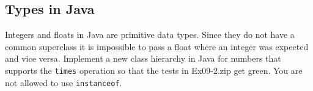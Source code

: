\documentclass [11pt, a4wide, twoside]{article}
\begin{document}
%
%
%

\subsection{Types in Java}
Integers and floats in Java are primitive data types. Since they do not have a
common superclass it is impossible to pass a float where an integer was
expected and vice versa. Implement a new class hierarchy in Java for numbers
that supports the \verb$times$ operation so that the tests in Ex09-2.zip get green.
You are not allowed to use \verb$instanceof$.
%
%
%
\end{document}
